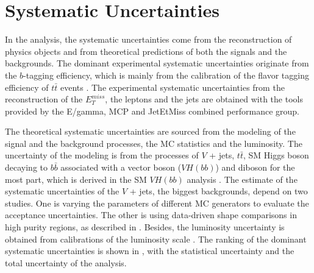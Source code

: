 \documentclass[class=NTHU_thesis, crop=false]{standalone}
\begin{document}
\chapter{Systematic Uncertainties}
\label{chap:systematic_uncertainties}
In the analysis, the systematic uncertainties come from the reconstruction of physics objects and from theoretical predictions of both the signals and the backgrounds. The dominant experimental systematic uncertainties originate from the $b$-tagging efficiency, which is mainly from the calibration of the flavor tagging efficiency of $t\bar{t}$ events \cite{ATL-PHYS-PUB-2017-013}. The experimental systematic uncertainties from the reconstruction of the $E^{miss}_T$, the leptons and the jets are obtained with the tools provided by the E/gamma, MCP and JetEtMiss combined performance group.

The theoretical systematic uncertainties are sourced from the modeling of the signal and the background processes, the MC statistics and the luminosity. The uncertainty of the modeling is from the processes of $V$ + jets, $t\bar{t}$, SM Higgs boson decaying to $b\bar{b}$ associated with a vector boson ($VH(bb)$) and diboson for the most part, which is derived in the SM $VH(bb)$ analysis \cite{Aaboud2017}. The estimate of the systematic uncertainties of the $V$ + jets, the biggest backgrounds, depend on two studies. One is varying the parameters of different MC generators to evaluate the acceptance uncertainties. The other is using data-driven shape comparisons in high purity regions, as described in . Besides, the luminosity uncertainty is obtained from calibrations of the luminosity scale \cite{Aaboud2016}. The ranking of the dominant systematic uncertainties is shown in , with the statistical uncertainty and the total uncertainty of the analysis.
\end{document}
